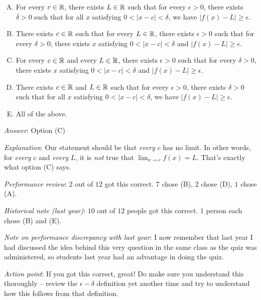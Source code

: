 \documentclass[10pt]{amsart}
\begin{document}
\begin{enumerate}
  \begin{enumerate}[(A)]
  \item For every $c \in \mathbb{R}$, there exists $L \in \mathbb{R}$ such that for
    every $\epsilon > 0$, there exists $\delta > 0$ such that for all
    $x$ satisfying $0 < |x - c| < \delta$, we have $|f(x) - L| \ge
    \epsilon$.
  \item There exists $c \in \mathbb{R}$ such that for every $L \in \mathbb{R}$, there
    exists $\epsilon > 0$ such that for every $\delta > 0$, there exists
    $x$ satisfying $0 < |x - c| < \delta$ and $|f(x) - L| \ge \epsilon$.
  \item For every $c \in \mathbb{R}$ and every $L \in \mathbb{R}$, there exists
    $\epsilon > 0$ such that for every $\delta > 0$, there exists $x$
    satisfying $0 < |x - c| < \delta$ and $|f(x) - L| \ge \epsilon$.
  \item There exists $c \in \mathbb{R}$ and $L \in \mathbb{R}$ such that for
    every $\epsilon > 0$, there exists $\delta > 0$ such that for all
    $x$ satisfying $0 < |x - c| < \delta$, we have $|f(x) - L| \ge
    \epsilon$.
  \item All of the above.
  \end{enumerate}

  {\em Answer}: Option (C)

  {\em Explanation}: Our statement should be that {\em every} $c$ has
  no limit. In other words, for {\em every} $c$ and {\em every} $L$,
  it is {\em not} true that $\lim_{x \to c} f(x) = L$. That's exactly
  what option (C) says.

  {\em Performance review}: $2$ out of $12$ got this correct. $7$
  chose (B), $2$ chose (D), $1$ chose (A).

  {\em Historical note (last year)}: $10$ out of $12$ people got this
  correct. $1$ person each chose (B) and (E).

  {\em Note on performance discrepancy with last year}: I now remember
  that last year I had discussed the idea behind this very question in
  the same class as the quiz was administered, so students last year
  had an advantage in doing the quiz.

  {\em Action point}: If you got this correct, great! Do make sure you
  understand this thoroughly -- review the $\epsilon-\delta$
  definition yet another time and try to understand how this follows
  from that definition.


\end{enumerate}
\end{document}
